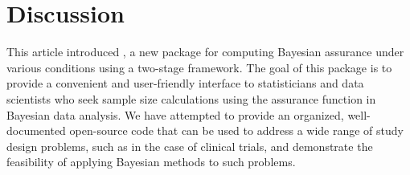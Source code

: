 \section{Discussion}
This article introduced ,
a new  package for computing Bayesian assurance under various conditions using a two-stage framework.  The goal of this package is to provide a convenient and user-friendly interface to statisticians and data scientists who seek sample size calculations using the assurance function in Bayesian data analysis. We have attempted to provide an organized, well-documented open-source code that can be used to address a wide range of study design problems, such as in the case of clinical trials, and demonstrate the feasibility
of applying Bayesian methods to such problems.



